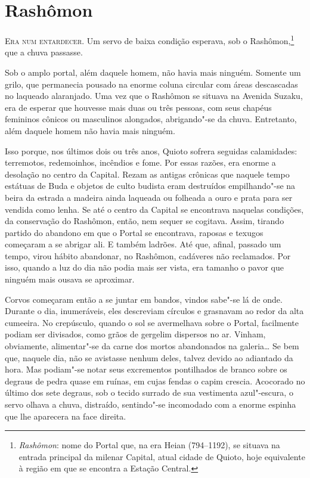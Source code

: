 
\chapter{Rashômon}

\noindent\textsc{Era num entardecer.} Um servo de baixa condição esperava, sob o
Rashômon,\footnote{ \textit{Rashômon}: nome do Portal que, na era Heian
(794--1192), se situava na entrada principal da milenar Capital, atual
cidade de Quioto, hoje equivalente à região em que se encontra a
Estação Central.} que a chuva passasse.

Sob o amplo portal, além daquele homem, não havia mais ninguém.
Somente um grilo, que permanecia pousado na enorme coluna circular
com áreas descascadas no laqueado alaranjado. Uma vez que o Rashômon se
situava na Avenida Suzaku, era de esperar que houvesse mais duas ou
três pessoas, com seus chapéus femininos cônicos ou masculinos
alongados, abrigando"-se da chuva. Entretanto, além daquele homem não
havia mais ninguém.

Isso porque, nos últimos dois ou três anos, Quioto sofrera seguidas
calamidades: terremotos, redemoinhos, incêndios e fome. Por essas
razões, era enorme a desolação no centro da Capital. Rezam as antigas
crônicas que naquele tempo estátuas de Buda e objetos de culto budista
eram destruídos empilhando"-se na beira da estrada a madeira ainda
laqueada ou folheada a ouro e prata para ser vendida como lenha. Se até
o centro da Capital se encontrava naquelas condições, da conservação do
Rashômon, então, nem sequer se cogitava. Assim, tirando partido do
abandono em que o Portal se encontrava, raposas e texugos começaram a
se abrigar ali. E também ladrões. Até que, afinal, passado um tempo,
virou hábito abandonar, no Rashômon, cadáveres não reclamados. Por
isso, quando a luz do dia não podia mais ser vista, era tamanho o pavor
que ninguém mais ousava se aproximar.

Corvos começaram então a se juntar em bandos, vindos sabe"-se lá de
onde. Durante o dia, inumeráveis, eles descreviam círculos e grasnavam
ao redor da alta cumeeira. No crepúsculo, quando o sol se avermelhava
sobre o Portal, facilmente podiam ser divisados, como grãos de gergelim
dispersos no ar. Vinham, obviamente, alimentar"-se da carne dos mortos
abandonados na galeria\ldots{} Se bem que, naquele dia, não se avistasse
nenhum deles, talvez devido ao adiantado da hora. Mas podiam"-se notar
seus excrementos pontilhados de branco sobre os degraus de pedra quase
em ruínas, em cujas fendas o capim crescia. Acocorado no último dos
sete degraus, sob o tecido surrado de sua vestimenta azul"-escura, o
servo olhava a chuva, distraído, sentindo"-se incomodado com a enorme
espinha que lhe aparecera na face direita.

